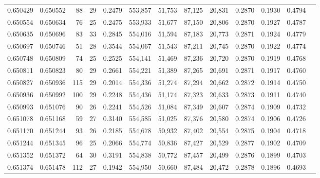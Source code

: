 \begin{tabular}{rrrrrrrrrrrrr}
0.650429 & 0.650552 &  88 &  29 &                                     0.2479 & 553,857 &  51,753 &  87,125 &  20,831 & 0.2870 & 0.1930 & 0.4794 \\
0.650554 & 0.650634 &  76 &  25 &                                     0.2475 & 553,933 &  51,677 &  87,150 &  20,806 & 0.2870 & 0.1927 & 0.4787 \\
0.650635 & 0.650696 &  83 &  33 &                                     0.2845 & 554,016 &  51,594 &  87,183 &  20,773 & 0.2871 & 0.1924 & 0.4779 \\
0.650697 & 0.650746 &  51 &  28 &                                     0.3544 & 554,067 &  51,543 &  87,211 &  20,745 & 0.2870 & 0.1922 & 0.4774 \\
0.650748 & 0.650809 &  74 &  25 &                                     0.2525 & 554,141 &  51,469 &  87,236 &  20,720 & 0.2870 & 0.1919 & 0.4768 \\
0.650811 & 0.650823 &  80 &  29 &                                     0.2661 & 554,221 &  51,389 &  87,265 &  20,691 & 0.2871 & 0.1917 & 0.4760 \\
0.650827 & 0.650936 & 115 &  29 &                                     0.2014 & 554,336 &  51,274 &  87,294 &  20,662 & 0.2872 & 0.1914 & 0.4750 \\
0.650936 & 0.650992 & 100 &  29 &                                     0.2248 & 554,436 &  51,174 &  87,323 &  20,633 & 0.2873 & 0.1911 & 0.4740 \\
0.650993 & 0.651076 &  90 &  26 &                                     0.2241 & 554,526 &  51,084 &  87,349 &  20,607 & 0.2874 & 0.1909 & 0.4732 \\
0.651078 & 0.651168 &  59 &  27 &                                     0.3140 & 554,585 &  51,025 &  87,376 &  20,580 & 0.2874 & 0.1906 & 0.4726 \\
0.651170 & 0.651244 &  93 &  26 &                                     0.2185 & 554,678 &  50,932 &  87,402 &  20,554 & 0.2875 & 0.1904 & 0.4718 \\
0.651244 & 0.651345 &  96 &  25 &                                     0.2066 & 554,774 &  50,836 &  87,427 &  20,529 & 0.2877 & 0.1902 & 0.4709 \\
0.651352 & 0.651372 &  64 &  30 &                                     0.3191 & 554,838 &  50,772 &  87,457 &  20,499 & 0.2876 & 0.1899 & 0.4703 \\
0.651374 & 0.651478 & 112 &  27 &                                     0.1942 & 554,950 &  50,660 &  87,484 &  20,472 & 0.2878 & 0.1896 & 0.4693 \\

\end{tabular}
